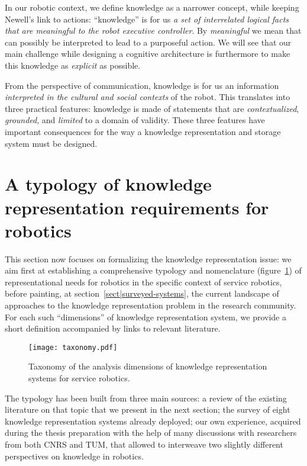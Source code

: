 In our robotic context, we define knowledge as a narrower concept, while
keeping Newell's link to actions: ``knowledge'' is for us  \emph{a set of
interrelated logical facts that are meaningful to the robot executive
controller}. By \emph{meaningful} we mean that can possibly be interpreted to
lead to a purposeful action. We will see that our main challenge while
designing a cognitive architecture is furthermore to make this knowledge as
\emph{explicit} as possible.


From the perspective of communication, knowledge is for us an information
\emph{interpreted in the cultural and social contexts} of the robot. This
translates into three practical features: knowledge is made of statements that
are \emph{contextualized}, \emph{grounded}, and \emph{limited} to a domain of
validity. These three features have important consequences for the way a
knowledge representation and storage system must be designed.

\section{A typology of knowledge representation requirements for robotics}
\label{sect|features}

This section now focuses on formalizing the knowledge representation issue: we
aim first at establishing a comprehensive typology and nomenclature
(figure~\ref{fig|taxo}) of representational needs for robotics in the specific
context of service robotics, before painting, at
section~\ref{sect|surveyed-systems}, the current landscape of approaches to the
knowledge representation problem in the research community. For each such
``dimensions'' of knowledge representation system, we provide a short
definition accompanied by links to relevant literature.

\begin{figure}
        \centering
        \texttt{[image: taxonomy.pdf]}
        \caption{Taxonomy of the analysis dimensions of knowledge
        representation systems for service robotics.}
        \label{fig|taxo}
\end{figure}

The typology has been built from three main sources: a review of the existing
literature on that topic that we present in the next section; the survey of
eight knowledge representation systems already deployed; our own experience,
acquired during the thesis preparation with the help of many discussions with
researchers from both CNRS and TUM, that allowed to interweave two slightly
different perspectives on knowledge in robotics.

